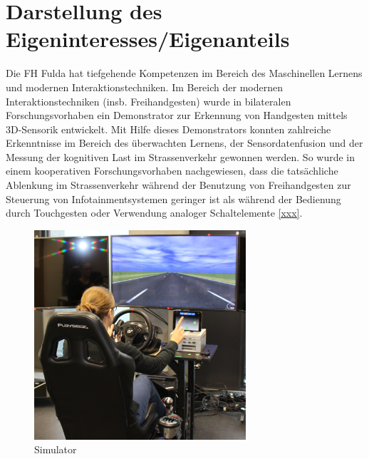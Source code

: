 \documentclass{article}
\begin{document}
\renewcommand{\thesection}{5}
\section{Darstellung des Eigeninteresses/Eigenanteils}
Die FH Fulda hat tiefgehende Kompetenzen im Bereich des Maschinellen Lernens und modernen Interaktionstechniken. Im Bereich der modernen Interaktionstechniken (insb. Freihandgesten) wurde in bilateralen Forschungsvorhaben ein Demonstrator zur Erkennung von Handgesten mittels 3D-Sensorik entwickelt. Mit Hilfe dieses Demonstrators konnten zahlreiche Erkenntnisse im Bereich des überwachten Lernens, der Sensordatenfusion und der Messung der kognitiven Last im Strassenverkehr gewonnen werden. So wurde in einem kooperativen Forschungsvorhaben nachgewiesen, dass die tatsächliche Ablenkung im Strassenverkehr während der Benutzung von Freihandgesten zur Steuerung von Infotainmentsystemen geringer ist als während der Bedienung durch Touchgesten oder Verwendung analoger Schaltelemente \ref{xxx}. 

\begin{figure}[ht]
	\centering
  \includegraphics[width=0.7\textwidth]{images/simulator.png}
	\caption{Simulator}
	\label{fig1}
\end{figure}
\end{document}
